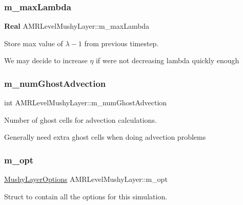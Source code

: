 \subsubsection{\texorpdfstring{m\+\_\+max\+Lambda}{m\_maxLambda}}
{\footnotesize\ttfamily \textbf{ Real} A\+M\+R\+Level\+Mushy\+Layer\+::m\+\_\+max\+Lambda\hspace{0.3cm}{\ttfamily [protected]}}



Store max value of $ \lambda-1 $ from previous timestep. 

We may decide to increase $ \eta $ if we\textquotesingle{}re not decreasing lambda quickly enough \mbox{\label{class_a_m_r_level_mushy_layer_a5ac61ca83db82c5642e21d7cbe83f37b}} 
\subsubsection{\texorpdfstring{m\+\_\+num\+Ghost\+Advection}{m\_numGhostAdvection}}
{\footnotesize\ttfamily int A\+M\+R\+Level\+Mushy\+Layer\+::m\+\_\+num\+Ghost\+Advection\hspace{0.3cm}{\ttfamily [protected]}}



Number of ghost cells for advection calculations. 

Generally need extra ghost cells when doing advection problems \mbox{\label{class_a_m_r_level_mushy_layer_a3652e6785ac8c5e429a5ac286ea3bc2e}} 
\subsubsection{\texorpdfstring{m\+\_\+opt}{m\_opt}}
{\footnotesize\ttfamily \hyperlink{struct_mushy_layer_options}{Mushy\+Layer\+Options} A\+M\+R\+Level\+Mushy\+Layer\+::m\+\_\+opt\hspace{0.3cm}{\ttfamily [protected]}}



Struct to contain all the options for this simulation. 

